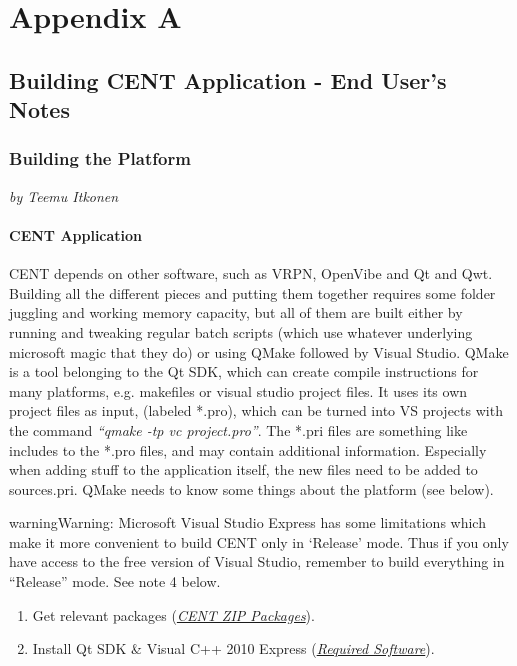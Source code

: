 \documentclass[letterpaper,10pt,english]{sphinxmanual}
\begin{document}
\chapter{Appendix A}
\label{index:id9}\label{index:appendix-a}

\section{\textbf{Building CENT Application - End User's Notes}}
\label{index:building-cent-application-end-user-s-notes}

\subsection{\textbf{Building the Platform}}
\label{index:build-plat}\label{index:building-the-platform}
\emph{by Teemu Itkonen}


\subsubsection{CENT Application}
\label{index:cent-application}
CENT depends on other software, such as VRPN, OpenVibe and Qt and Qwt. Building all the different pieces and putting them together requires some folder juggling and working memory capacity, but all of them are built either by running and tweaking regular batch scripts (which use whatever underlying microsoft magic that they do) or using QMake followed by Visual Studio. QMake is a tool belonging to the Qt SDK, which can create compile instructions for many platforms, e.g. makefiles or visual studio project files. It uses its own project files as input, (labeled *.pro), which can be turned into VS projects with the command \emph{``qmake -tp vc project.pro''}. The *.pri files are something like includes to the *.pro files, and may contain additional information. Especially when adding stuff to the application itself, the new files need to be added to sources.pri. QMake needs to know some things about the platform (see below).

\begin{notice}{warning}{Warning:}
Microsoft Visual Studio Express has some limitations which make it more convenient to build CENT only in `Release' mode. Thus if you only have access to the free version of Visual Studio, remember to build everything in ``Release'' mode. See note 4 below.
\end{notice}
\begin{enumerate}
\item {} 
Get relevant packages ({\hyperref[index:cent-package]{\emph{CENT ZIP Packages}}}).

\item {} 
Install Qt SDK \& Visual C++ 2010 Express ({\hyperref[index:req-soft]{\emph{Required Software}}}).

\end{enumerate}
\end{document}
